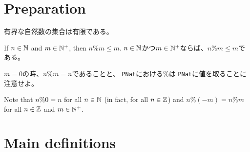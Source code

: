 %



\chapter{Preparation}

\begin{lemma}
\label{lem:finite_of_bounded_of_Nat}
\leanok
有界な自然数の集合は有限である。
\end{lemma}

\begin{lemma}
\label{lem:nat_mod_pnat_le}
\leanok
If $n \in \mathbb{N}$ and $m \in \mathbb{N}^+$,
then $n \% m \le m$.
$n \in \mathbb{N}$かつ$m \in \mathbb{N}^+$ならば、$n \% m \le m$である。
\end{lemma}

\begin{remark}
$m=0$の時、$n \% m = n$であることと、
\texttt{PNat}における$\%$は
\texttt{PNat}に値を取ることに注意せよ。
\end{remark}

\begin{remark}
Note that $n \% 0 = n$ for all $n \in \mathbb{N}$
(in fact, for all $n \in \mathbb{Z}$)
and $n \% (-m) = n \% m$
for all
$n \in \mathbb{Z}$
and
$m \in \mathbb{N}^+$.
\end{remark}

\chapter{Main definitions}

